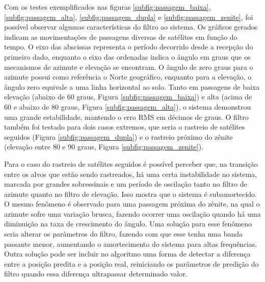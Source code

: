 Com os testes exemplificados nas figuras \ref{subfig:passagem_baixa}, \ref{subfig:passagem_alta}, \ref{subfig:passagem_dupla} e \ref{subfig:passagem_zenite}, foi possível observar algumas características do filtro ao sistema.
Os gráficos gerados indicam as movimentações de passagens diversas de satélites em função do tempo. O eixo das abscissas representa o período decorrido desde a recepção do primeiro dado, enquanto o eixo das ordenadas indica o ângulo em graus que os mecanismos de azimute e elevação se encontram.
O ângulo de zero graus para o azimute possui como referência o Norte geográfico, enquanto para a elevação, o ângulo zero equivale a uma linha horizontal ao solo.
Tanto em passagens de baixa elevação (abaixo de 60 graus, Figura \ref{subfig:passagem_baixa}) e alta (acima de 60 e abaixo de 80 graus, Figura \ref{subfig:passagem_alta}), o sistema demonstrou uma grande estabilidade, mantendo o erro RMS em décimos de graus.
O filtro também foi testado para dois casos extremos, que seria o rastreio de satélites seguidos (Figura \ref{subfig:passagem_dupla}) e o rastreio próximo do zênite (elevação entre 80 e 90 graus, Figura \ref{subfig:passagem_zenite}).

Para o caso do rastreio de satélites seguidos é possível perceber que, na transição entre os alvos que estão sendo rastreados, há uma certa instabilidade no sistema, marcada por grandes sobressinais e um período de oscilação tanto no filtro de azimute quanto no filtro de elevação. Isso mostra que o sistema é subamortecido.
O mesmo fenômeno é observado para uma passagem próxima do zênite, na qual o azimute sofre uma variação brusca, fazendo ocorrer uma oscilação quando há uma diminuição na taxa de crescimento do ângulo.
Uma solução para esse fenômeno seria alterar os parâmetros do filtro, fazendo com que esse tenha uma banda passante menor, aumentando o amortecimento do sistema para altas frequências.
Outra solução pode ser incluir no algoritmo uma forma de detectar a diferença entre a posição predita e a posição real, reiniciando os parâmetros de predição do filtro quando essa diferença ultrapassar determinado valor.

